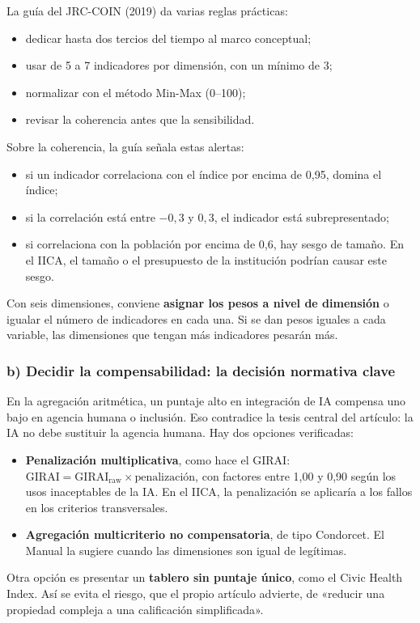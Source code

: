 \documentclass[11pt,a4paper]{article}
\begin{document}
La guía del JRC-COIN (2019) da varias reglas prácticas:
\begin{itemize}
  \item dedicar hasta dos tercios del tiempo al marco conceptual;
  \item usar de 5 a 7 indicadores por dimensión, con un mínimo de 3;
  \item normalizar con el método Min-Max (0--100);
  \item revisar la coherencia antes que la sensibilidad.
\end{itemize}

Sobre la coherencia, la guía señala estas alertas:
\begin{itemize}
  \item si un indicador correlaciona con el índice por encima de 0,95, domina el índice;
  \item si la correlación está entre $-0{,}3$ y $0{,}3$, el indicador está subrepresentado;
  \item si correlaciona con la población por encima de 0,6, hay sesgo de tamaño. En el IICA, el tamaño o el presupuesto de la institución podrían causar este sesgo.
\end{itemize}

Con seis dimensiones, conviene \textbf{asignar los pesos a nivel de dimensión} o igualar el número de indicadores en cada una. Si se dan pesos iguales a cada variable, las dimensiones que tengan más indicadores pesarán más.

\subsubsection*{b) Decidir la compensabilidad: la decisión normativa clave}
En la agregación aritmética, un puntaje alto en integración de IA compensa uno bajo en agencia humana o inclusión. Eso contradice la tesis central del artículo: la IA no debe sustituir la agencia humana. Hay dos opciones verificadas:
\begin{itemize}
  \item \textbf{Penalización multiplicativa}, como hace el GIRAI: $\text{GIRAI} = \text{GIRAI}_{\text{raw}} \times \text{penalización}$, con factores entre 1,00 y 0,90 según los usos inaceptables de la IA. En el IICA, la penalización se aplicaría a los fallos en los criterios transversales.
  \item \textbf{Agregación multicriterio no compensatoria}, de tipo Condorcet. El Manual la sugiere cuando las dimensiones son igual de legítimas.
\end{itemize}
Otra opción es presentar un \textbf{tablero sin puntaje único}, como el Civic Health Index. Así se evita el riesgo, que el propio artículo advierte, de «reducir una propiedad compleja a una calificación simplificada».
\end{document}
